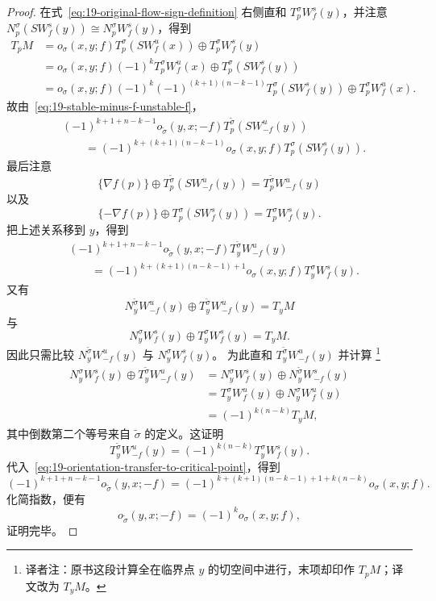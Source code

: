 \begin{proof}
在式~\eqref{eq:19-original-flow-sign-definition} 右侧直和
$T_p^\sigma W_f^s(y)$，并注意
$N_p^\sigma(S W_f^s(y))\cong N_p^\sigma W_f^s(y)$，得到
\[
\begin{aligned}
 T_pM
 &=o_\sigma(x,y;f)T_p^\sigma(S W_f^u(x))\oplus T_p^\sigma W_f^s(y)\\
 &=o_\sigma(x,y;f)(-1)^kT_p^\sigma W_f^u(x)
 \oplus T_p^\sigma(S W_f^s(y))\\
 &=o_\sigma(x,y;f)(-1)^k(-1)^{(k+1)(n-k-1)}
 T_p^\sigma(S W_f^s(y))\oplus T_p^\sigma W_f^u(x).
\end{aligned}
\]
故由~\eqref{eq:19-stable-minus-f-unstable-f}，
\[
\begin{aligned}
 &(-1)^{k+1+n-k-1}o_{\widetilde\sigma}(y,x;-f)
 T_p^{\widetilde\sigma}(S W_{-f}^u(y))\\
 &\qquad=(-1)^{k+(k+1)(n-k-1)}o_\sigma(x,y;f)
 T_p^\sigma(S W_f^s(y)).
\end{aligned}
\]
最后注意
\[
 \{\nabla f(p)\}\oplus T_p^{\widetilde\sigma}(S W_{-f}^u(y))
 =T_p^{\widetilde\sigma}W_{-f}^u(y)
\]
以及
\[
 \{-\nabla f(p)\}\oplus T_p^\sigma(S W_f^s(y))=T_p^\sigma W_f^s(y).
\]
把上述关系移到 $y$，得到
\begin{equation}
\begin{aligned}
 &(-1)^{k+1+n-k-1}o_{\widetilde\sigma}(y,x;-f)
 T_y^{\widetilde\sigma}W_{-f}^u(y)\\
 &\qquad=(-1)^{k+(k+1)(n-k-1)+1}o_\sigma(x,y;f)
 T_y^\sigma W_f^s(y).
\end{aligned}
\label{eq:19-orientation-transfer-to-critical-point}
\end{equation}
又有
\[
 N_y^{\widetilde\sigma}W_{-f}^u(y)
 \oplus T_y^{\widetilde\sigma}W_{-f}^u(y)=T_yM
\]
与
\[
 N_y^\sigma W_f^s(y)\oplus T_y^\sigma W_f^s(y)=T_yM.
\]
因此只需比较 $N_y^{\widetilde\sigma}W_{-f}^u(y)$ 与 $N_y^\sigma W_f^s(y)$。
为此直和 $T_y^{\widetilde\sigma}W_{-f}^u(y)$ 并计算
\footnote{译者注：原书这段计算全在临界点 $y$ 的切空间中进行，末项却印作
$T_pM$；译文改为 $T_yM$。}
\[
\begin{aligned}
 N_y^\sigma W_f^s(y)\oplus T_y^{\widetilde\sigma}W_{-f}^u(y)
 &=N_y^\sigma W_f^s(y)\oplus N_y^{\widetilde\sigma}W_{-f}^s(y)\\
 &=T_y^\sigma W_f^u(y)\oplus N_y^\sigma W_f^u(y)\\
 &=(-1)^{k(n-k)}T_yM,
\end{aligned}
\]
其中倒数第二个等号来自 $\widetilde\sigma$ 的定义。这证明
\[
 T_y^{\widetilde\sigma}W_{-f}^u(y)
 =(-1)^{k(n-k)}T_y^\sigma W_f^s(y).
\]
代入~\eqref{eq:19-orientation-transfer-to-critical-point}，得到
\[
 (-1)^{k+1+n-k-1}o_{\widetilde\sigma}(y,x;-f)
 =(-1)^{k+(k+1)(n-k-1)+1+k(n-k)}o_\sigma(x,y;f).
\]
化简指数，便有
\[
 o_{\widetilde\sigma}(y,x;-f)=(-1)^ko_\sigma(x,y;f),
\]
证明完毕。
\end{proof}

